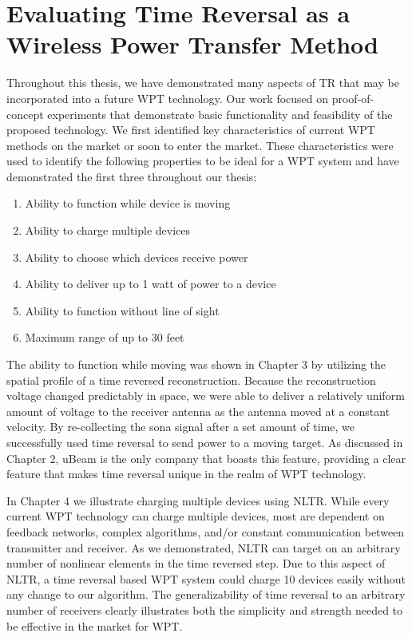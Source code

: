 \section{Evaluating Time Reversal as a Wireless Power Transfer Method}

Throughout this thesis, we have demonstrated many aspects of TR that may be incorporated into a future WPT technology. Our work focused on proof-of-concept experiments that demonstrate basic functionality and feasibility of the proposed technology.  We first identified key characteristics of current WPT methods on the market or soon to enter the market. These characteristics were used to identify the following properties to be ideal for a WPT system and have demonstrated the first three throughout our thesis:

\begin{enumerate}
\item Ability to function while device is moving
\item Ability to charge multiple devices
\item Ability to choose which devices receive power
\item Ability to deliver up to 1 watt of power to a device
\item Ability to function without line of sight
\item Maximum range of up to 30 feet
\end{enumerate}

The ability to function while moving was shown in Chapter 3 by utilizing the spatial profile of a time reversed reconstruction. Because the reconstruction voltage changed predictably in space, we were able to deliver a relatively uniform amount of voltage to the receiver antenna as the antenna moved at a constant velocity. By re-collecting the sona signal after a set amount of time, we successfully used time reversal to send power to a moving target.  As discussed in Chapter 2, uBeam is the only company that boasts this feature, providing a clear feature that makes time reversal unique in the realm of WPT technology.

In Chapter 4 we illustrate charging multiple devices using NLTR. While every current WPT technology can charge multiple devices, most are dependent on feedback networks, complex algorithms, and/or constant communication between transmitter and receiver. As we demonstrated, NLTR can target on an arbitrary number of nonlinear elements in the time reversed step. Due to this aspect of NLTR, a time reversal based WPT system could charge 10 devices easily without any change to our algorithm. The generalizability of time reversal to an arbitrary number of receivers clearly illustrates both the simplicity and strength needed to be effective in the market for WPT.

